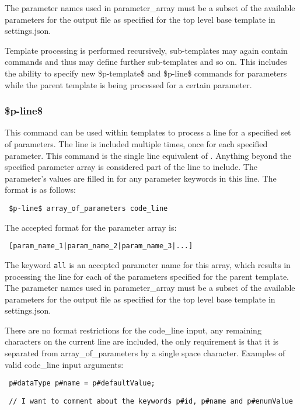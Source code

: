 \documentclass{settings/TU_Delft_Report}
\begin{document}
The parameter names used in parameter\_array must be a subset of the available parameters for the output file as specified for the top level base template in settings.json.

Template processing is performed recursively, sub-templates may again contain commands and thus may define further sub-templates and so on. This includes the ability to specify new \$p-template\$ and \$p-line\$ commands for parameters while the parent template is being processed for a certain parameter.

\subsubsection{\$p-line\$} \label{p-line}
This command can be used within templates to process a line for a specified set of parameters. The line is included multiple times, once for each specified parameter. This command is the single line equivalent of . Anything beyond the specified parameter array is considered part of the line to include. The parameter's values are filled in for any parameter keywords in this line. The format is as follows:
\begin{lstlisting}
 $p-line$ array_of_parameters code_line
\end{lstlisting}
The accepted format for the parameter array is:
\begin{lstlisting}
 [param_name_1|param_name_2|param_name_3|...]
\end{lstlisting}
The keyword \lstinline{all} is an accepted parameter name for this array, which results in processing the line for each of the parameters specified for the parent template.\\

The parameter names used in parameter\_array must be a subset of the available parameters for the output file as specified for the top level base template in settings.json.

There are no format restrictions for the code\_line input, any remaining characters on the current line are included, the only requirement is that it is separated from array\_of\_parameters by a single space character. Examples of valid code\_line input arguments:
\begin{lstlisting}
 p#dataType p#name = p#defaultValue;
\end{lstlisting}

\begin{lstlisting}
 // I want to comment about the keywords p#id, p#name and p#enumValue
\end{lstlisting}
\end{document}
